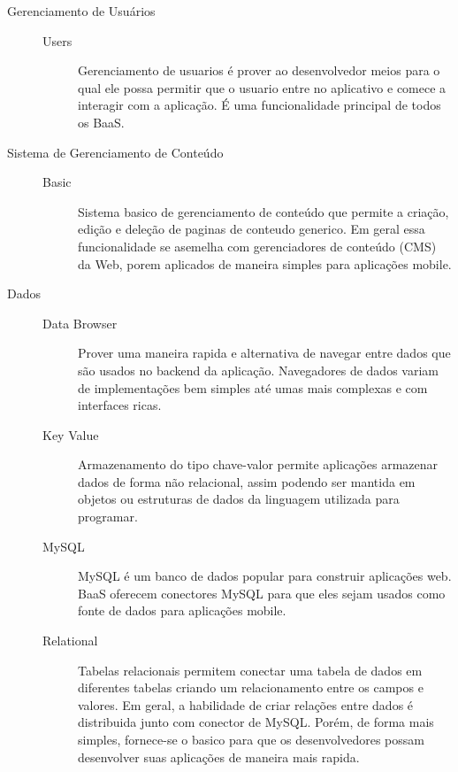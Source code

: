 	\begin{description}
		\item[Gerenciamento de Usuários]
			\begin{description}
            	\item[]
				\item[Users]{Gerenciamento de usuarios é prover ao  desenvolvedor meios para o qual ele possa permitir que o usuario entre no aplicativo e comece a interagir com a aplicação. É uma funcionalidade principal de todos os BaaS.}
			\end{description}
		
		\item[Sistema de Gerenciamento de Conteúdo]
			\begin{description}
            	\item[]
				\item[Basic]{Sistema basico de gerenciamento de conteúdo que permite a criação, edição e deleção de paginas de conteudo generico. Em geral essa funcionalidade se asemelha com gerenciadores de conteúdo (CMS) da Web, porem aplicados de maneira simples para aplicações mobile.}
			\end{description}
		
		\item[Dados]
			\begin{description}
            	\item[]
				\item[Data Browser] { Prover uma maneira rapida e alternativa de navegar entre dados que são usados no backend da aplicação. Navegadores de dados variam de implementações bem simples até umas mais complexas e com interfaces ricas.}
				
				\item[Key Value] {Armazenamento do tipo chave-valor permite aplicações armazenar dados de forma não relacional, assim podendo ser mantida em objetos ou estruturas de dados da linguagem utilizada para programar.}
				
				\item[MySQL] {MySQL é um banco de dados popular para construir aplicações web.  BaaS oferecem conectores MySQL para que eles sejam usados como fonte de dados para aplicações mobile.}
				
				\item[Relational] { Tabelas relacionais permitem conectar uma tabela de dados em diferentes tabelas criando um relacionamento entre os campos e valores. Em geral, a habilidade de criar relações entre dados é distribuida junto com conector de MySQL. Porém, de forma mais simples, fornece-se o basico para que os desenvolvedores possam desenvolver suas aplicações de maneira mais rapida.}


\end{description}
\end{description}

